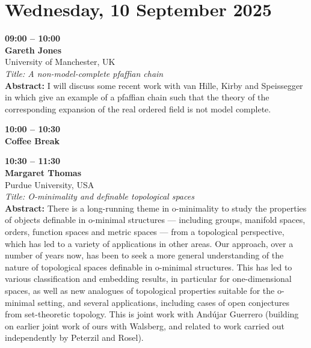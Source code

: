 \documentclass[10pt,a4paper]{article}
\begin{document}
\section{Wednesday, 10 September 2025}
\begin{tcolorbox}[talkbox]
\textbf{09:00 -- 10:00} \\
\textbf{Gareth Jones} \\
University of Manchester, UK \\
\textit{Title: A non-model-complete pfaffian chain} \\
\textbf{Abstract:} I will discuss some recent work with van Hille, Kirby and Speissegger in which give an example of a pfaffian chain such that the theory of the corresponding expansion of the real ordered field is not model complete.
\end{tcolorbox}
\begin{tcolorbox}[talkbox]
\textbf{10:00 -- 10:30} \\
\textbf{Coffee Break} 
\end{tcolorbox}
\begin{tcolorbox}[talkbox]
\textbf{10:30 -- 11:30} \\
\textbf{Margaret Thomas} \\
Purdue University, USA \\
\textit{Title: O-minimality and definable topological spaces} \\
\textbf{Abstract:} There is a long-running theme in o-minimality to study the properties of objects definable in o-minimal structures — including groups, manifold spaces, orders, function spaces and metric spaces — from a topological perspective, which has led to a variety of applications in other areas. Our approach, over a number of years now, has been to seek a more general understanding of the nature of topological spaces definable in o-minimal structures. This has led to various classification and embedding results, in particular for one-dimensional spaces, as well as new analogues of topological properties suitable for the o-minimal setting, and several applications, including cases of open conjectures from set-theoretic topology. This is joint work with Andújar Guerrero (building on earlier joint work of ours with Walsberg, and related to work carried out independently by Peterzil and Rosel).
\end{tcolorbox}
\end{document}
